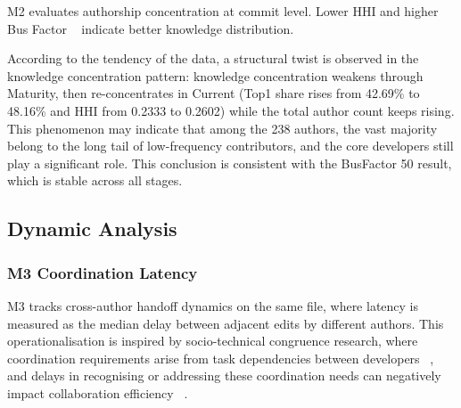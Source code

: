 \documentclass[11pt, a4paper]{article}
\begin{document}
M2 evaluates authorship concentration at commit level. Lower HHI and higher Bus Factor ~\cite{bus_factor} indicate better knowledge distribution.

\begin{table}[H]
\centering
\small
{}
\caption{M2 Knowledge Concentration by stage.}
\label{tab:m2_knowledge_concentration}
\end{table}

According to the tendency of the data, a structural twist is observed in the knowledge concentration pattern: knowledge concentration weakens through Maturity, then re-concentrates in Current (Top1 share rises from 42.69\% to 48.16\% and HHI from 0.2333 to 0.2602) while the total author count keeps rising. This phenomenon may indicate that among the 238 authors, the vast majority belong to the long tail of low-frequency contributors, and the core developers still play a significant role. This conclusion is consistent with the BusFactor 50 result, which is stable across all stages.

\subsection{Dynamic Analysis}

\subsubsection{M3 Coordination Latency}

M3 tracks cross-author handoff dynamics on the same file, where latency is measured as the median delay between adjacent edits by different authors. This operationalisation is inspired by socio-technical congruence research, where coordination requirements arise from task dependencies between developers ~\cite{cataldo_coordination_2013}, and delays in recognising or addressing these coordination needs can negatively impact collaboration efficiency ~\cite{blincoe_proximity_2012}.
\end{document}
